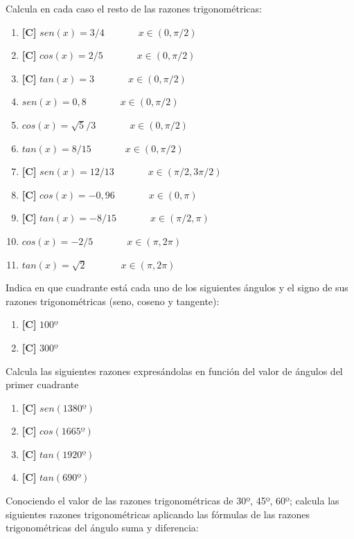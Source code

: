 \Exercicio Calcula en cada caso el resto de las razones trigonométricas:
\begin{enumerate}[topsep=0pt]
	\item \textbf{[C]} $sen(x) = 3/4$~~~~~~~$x \in (0,\pi/2)$
	\item \textbf{[C]} $cos(x) = 2/5$~~~~~~~$x \in (0,\pi/2)$
	\item \textbf{[C]} $tan(x) = 3$~~~~~~~$x \in (0,\pi/2)$
	\item $sen(x) = 0,8$~~~~~~~$x \in (0,\pi/2)$
	\item $cos(x)= \sqrt{5}/3$~~~~~~~$x \in (0,\pi/2)$
	\item $tan(x) = 8/15$~~~~~~~$x \in (0,\pi/2)$
	\item \textbf{[C]} $sen (x)=12/13$~~~~~~~$x \in (\pi/2,3\pi/2)$
	\item \textbf{[C]} $cos(x) = -0,96$~~~~~~~$x \in (0,\pi)$
	\item \textbf{[C]} $tan(x) = -8/15$~~~~~~~$x \in (\pi/2,\pi)$
	\item $cos(x)=-2/5$~~~~~~~$x \in (\pi, 2\pi)$
	\item $tan(x)=\sqrt{2}$~~~~~~~$x \in (\pi, 2\pi)$
\end{enumerate}


\Exercicio Indica en que cuadrante está cada uno de los siguientes ángulos y el signo de sus razones trigonométricas (seno, coseno y tangente):

\begin{enumerate}[topsep=0pt]
	\item \textbf{[C]} $ 100º $
	\item \textbf{[C]} $ 300º $
\end{enumerate}

\Exercicio Calcula las siguientes razones expresándolas en función del valor de ángulos del primer cuadrante

\begin{enumerate}[topsep=0pt]
	\item \textbf{[C]} $ sen(1380º) $
	\item \textbf{[C]} $ cos(1665º) $
	\item \textbf{[C]} $ tan(1920º) $
	\item \textbf{[C]} $ tan(690º) $
\end{enumerate}


\Exercicio Conociendo el valor de las razones trigonométricas de 30º, 45º, 60º; calcula las siguientes razones trigonométricas aplicando las fórmulas de las razones trigonométricas del ángulo suma y diferencia:


